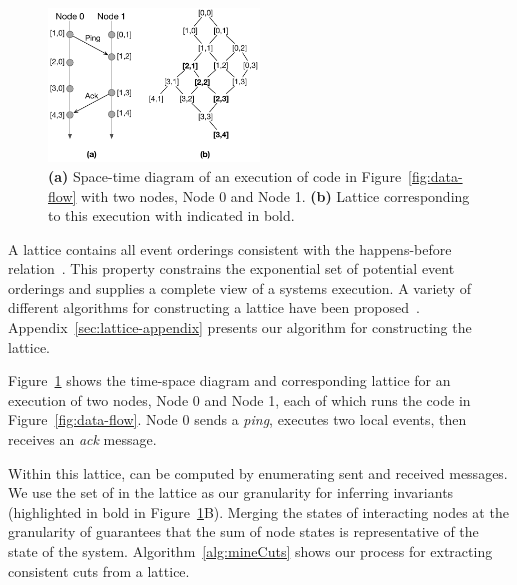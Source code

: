 \begin{figure}[t]
    \includegraphics[width=0.50\textwidth]{fig/time-diagram}
    \caption{\textbf{(a)} Space-time diagram of an execution of code
      in Figure~\ref{fig:data-flow} with two nodes, Node 0 and Node
      1. \textbf{(b)} Lattice corresponding to this execution with
       indicated in bold.}
\label{fig:time-lattice} 
\end{figure}


A lattice contains all event orderings consistent with the
happens-before relation~\cite{Cooper:1991:CDG:122759.122774}. This
property constrains the exponential set of potential event orderings
and supplies a complete view of a systems execution. A variety of
different algorithms for constructing a lattice have been
proposed~\cite{Garg}. Appendix~\ref{sec:lattice-appendix} presents our
algorithm for constructing the lattice.

Figure~\ref{fig:time-lattice} shows the time-space diagram and
corresponding lattice for an execution of two nodes, Node 0 and Node 1,
each of which runs the code in
Figure~\ref{fig:data-flow}. Node 0 sends a \emph{ping}, executes
two local events, then receives an \emph{ack} message.

%
%
Within this lattice, \scc can be computed by enumerating sent and
received messages. We use the set of \scc in the lattice as our
granularity for inferring invariants (highlighted in bold in
Figure~\ref{fig:time-lattice}B). Merging the states of interacting
nodes at the granularity of \scc guarantees that the sum of node
states is representative of the state of the system.
Algorithm~\ref{alg:mineCuts} shows our process for extracting
consistent cuts from a lattice.

